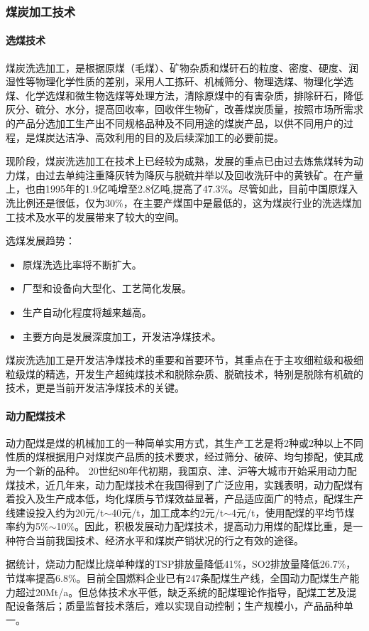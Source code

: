 \documentclass[10pt,openany]{ctexbook}
\begin{document}
\subsubsection{煤炭加工技术}
\paragraph{选煤技术} 煤炭洗选加工，是根据原煤（毛煤）、矿物杂质和煤矸石的粒度、密度、硬度、润湿性等物理化学性质的差别，采用人工拣矸、机械筛分、物理选煤、物理化学选煤、化学选煤和微生物选煤等处理方法，清除原煤中的有害杂质，排除矸石，降低灰分、硫分、水分，提高回收率，回收伴生物矿，改善煤炭质量，按照市场所需求的产品分选加工生产出不同规格品种及不同用途的煤炭产品，以供不同用户的过程，是煤炭达洁净、高效利用的目的及后续深加工的必要前提。\par
现阶段，煤炭洗选加工在技术上已经较为成熟，发展的重点已由过去炼焦煤转为动力煤，由过去单纯注重降灰转为降灰与脱硫并举以及回收洗矸中的黄铁矿。在产量上，也由1995年的1.9亿吨增至2.8亿吨,提高了47.3\%。尽管如此，目前中国原煤入洗比例还是很低，仅为30\%，在主要产煤国中是最低的，这为煤炭行业的洗选煤加工技术及水平的发展带来了较大的空间。\par
选煤发展趋势：
\begin{itemize}
\item 原煤洗选比率将不断扩大。
\item 厂型和设备向大型化、工艺简化发展。
\item 生产自动化程度将越来越高。
\item 主要方向是发展深度加工，开发洁净煤技术。

\end{itemize}

煤炭洗选加工是开发洁净煤技术的重要和首要环节，其重点在于主攻细粒级和极细粒级煤的精选，开发生产超纯煤技术和脱除杂质、脱硫技术，特别是脱除有机硫的技术，更是当前开发洁净煤技术的关键。
\paragraph{动力配煤技术}
动力配煤是煤的机械加工的一种简单实用方式，其生产工艺是将2种或2种以上不同性质的煤根据用户对煤炭产品质的技术要求，经过筛分、破碎、均匀掺配，使其成为一个新的品种。 20世纪80年代初期，我国京、津、沪等大城市开始采用动力配煤技术，近几年来，动力配煤技术在我国得到了广泛应用，实践表明，动力配煤有着投入及生产成本低，均化煤质与节煤效益显著，产品适应面广的特点，配煤生产线建设投入约为20元/t$\sim$40元/t，加工成本约2元/t$\sim$4元/t，使用配煤的平均节煤率约为5\%$\sim$10\%。因此，积极发展动力配煤技术，提高动力用煤的配煤比重，是一种符合当前我国技术、经济水平和煤炭产销状况的行之有效的途径。\par
据统计，烧动力配煤比烧单种煤的TSP排放量降低41\%，SO2排放量降低26.7\%，节煤率提高6.8\%。目前全国燃料企业已有247条配煤生产线，全国动力配煤生产能力超过20Mt/a。但总体技术水平低，缺乏系统的配煤理论作指导，配煤工艺及混配设备落后；质量监督技术落后，难以实现自动控制；生产规模小，产品品种单一。
\end{document}

